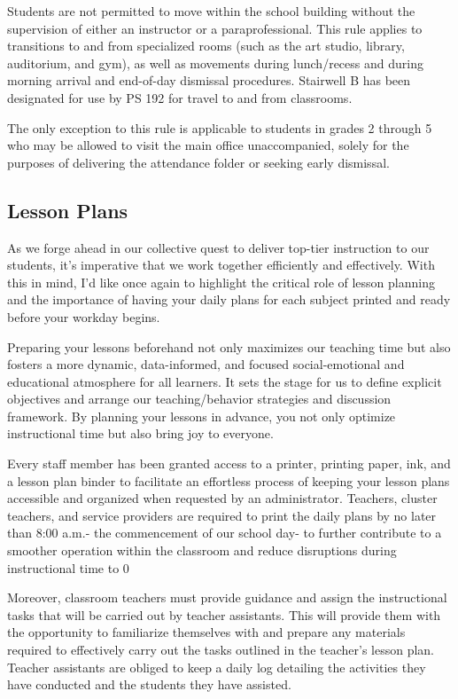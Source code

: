 \documentclass[11pt, letterpaper]{article}
\begin{document}
Students are not permitted to move within the school building without the supervision of either an instructor or a paraprofessional. This rule applies to transitions to and from specialized rooms (such as the art studio, library, auditorium, and gym), as well as movements during lunch/recess and during morning arrival and end-of-day dismissal procedures. Stairwell B has been designated for use by PS 192 for travel to and from classrooms.

The only exception to this rule is applicable to students in grades 2 through 5 who may be allowed to visit the main office unaccompanied, solely for the purposes of delivering the attendance folder or seeking early dismissal.

\subsection{Lesson Plans}
As we forge ahead in our collective quest to deliver top-tier instruction to our students, it's imperative that we work together efficiently and effectively. With this in mind, I'd like once again to highlight the critical role of lesson planning and the importance of having your daily plans for each subject printed and ready before your workday begins.

Preparing your lessons beforehand not only maximizes our teaching time but also fosters a more dynamic, data-informed, and focused social-emotional and educational atmosphere for all learners. It sets the stage for us to define explicit objectives and arrange our teaching/behavior strategies and discussion framework. By planning your lessons in advance, you not only optimize instructional time but also bring joy to everyone.

Every staff member has been granted access to a printer, printing paper, ink, and a lesson plan binder to facilitate an effortless process of keeping your lesson plans accessible and organized when requested by an administrator. Teachers, cluster teachers, and service providers are required to print the daily plans by no later than 8:00 a.m.- the commencement of our school day- to further contribute to a smoother operation within the classroom and reduce disruptions during instructional time to 0%

Moreover, classroom teachers must provide guidance and assign the instructional tasks that will be carried out by teacher assistants. This will provide them with the opportunity to familiarize themselves with and prepare any materials required to effectively carry out the tasks outlined in the teacher's lesson plan. Teacher assistants are obliged to keep a daily log detailing the activities they have conducted and the students they have assisted.
\end{document}
